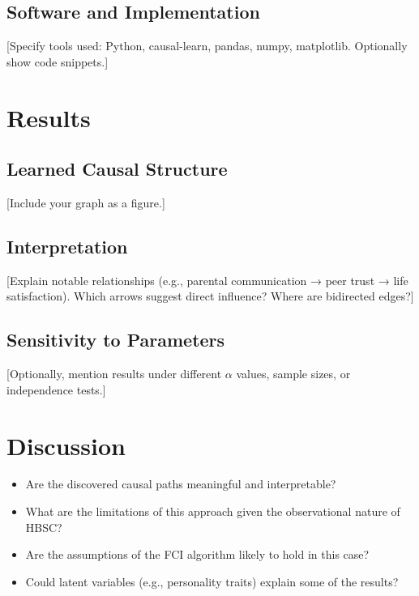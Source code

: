 \documentclass[a4paper]{article}
\begin{document}
\subsection{Software and Implementation}
[Specify tools used: Python, causal-learn, pandas, numpy, matplotlib. Optionally show code snippets.]

\section{Results}
\label{sec:results}

\subsection{Learned Causal Structure}
[Include your graph as a figure.]


\subsection{Interpretation}
[Explain notable relationships (e.g., parental communication → peer trust → life satisfaction). Which arrows suggest direct influence? Where are bidirected edges?]

\subsection{Sensitivity to Parameters}
[Optionally, mention results under different $\alpha$ values, sample sizes, or independence tests.]

\section{Discussion}
\label{sec:discussion}

\begin{itemize}
    \item Are the discovered causal paths meaningful and interpretable?
    \item What are the limitations of this approach given the observational nature of HBSC?
    \item Are the assumptions of the FCI algorithm likely to hold in this case?
    \item Could latent variables (e.g., personality traits) explain some of the results?
\end{itemize}
\end{document}
